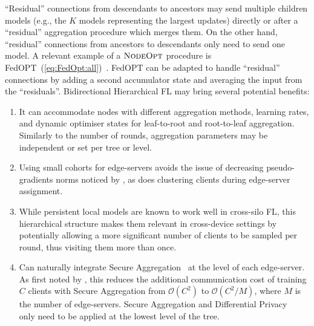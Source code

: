``Residual'' connections from descendants to ancestors may send multiple children models (e.g., the $K$ models representing the largest updates) directly or after a ``residual'' aggregation procedure which merges them. On the other hand, ``residual'' connections from ancestors to descendants only need to send one model. A relevant example of a $\textsc{NodeOpt}$ procedure is FedOPT~(\cref{eq:FedOpt:all})~\citep{FedOPT}. FedOPT can be adapted to handle ``residual'' connections by adding a second accumulator state and averaging the input from the ``residuals''.
Bidirectional Hierarchical FL  may bring several potential benefits:
\begin{enumerate}
    \item It can accommodate nodes with different aggregation methods, learning rates, and dynamic optimiser states for leaf-to-root and root-to-leaf aggregation. Similarly to the number of rounds, aggregation parameters may be independent or set per tree or level.
    \item Using small cohorts for edge-servers avoids the issue of decreasing pseudo-gradients norms noticed by \citet{LargeCohorts}, as does clustering clients during edge-server assignment.
    \item While persistent local models are known to work well in cross-silo FL, this hierarchical structure makes them relevant in cross-device settings by potentially allowing a more significant number of clients to be sampled per round, thus visiting them more than once.
    \item Can naturally integrate Secure Aggregation~\citep{SecAggOG,FastSecAgg} at the level of each edge-server. As first noted by \citet{ScaleSystemDesign}, this reduces the additional communication cost of training $C$ clients with Secure Aggregation from $\mathcal{O}(C^2)$ to $\mathcal{O}(C^2/M)$, where $M$ is the number of edge-servers. Secure Aggregation and Differential Privacy~\citep{DiffPrivacyFL} only need to be applied at the lowest level of the tree.
\end{enumerate}

